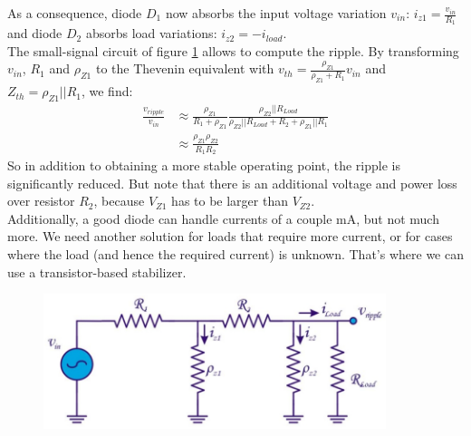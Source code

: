 As a consequence, diode $D_1$ now absorbs the input voltage variation $v_{in}$: $i_{z1} = \frac{v_{in}}{R_1}$ and diode $D_2$ absorbs load variations: $i_{z2} = -i_{load}$.\\
The small-signal circuit of figure \ref{fig:stabilizer5} allows to compute the ripple. 
By transforming $v_{in}$, $R_1$ and $\rho_{Z1}$ to the Thevenin equivalent with $v_{th} = \frac{\rho_{Z1}}{\rho_{Z1} + R_1} v_{in}$ and $Z_{th} = \rho_{Z1} || R_1$, we find:
\begin{align*}
	\frac{v_{ripple}}{v_{in}} &\approx \frac{\rho_{Z1}}{R_1 + \rho_{Z1}}  \frac{\rho_{Z2} || R_{Load}}{\rho_{Z2} || R_{Load} + R_2 + \rho_{Z1} || R_1} \\
							  &\approx \frac{\rho_{Z1} \rho_{Z2}}{R_1  R_2}
\end{align*}
So in addition to obtaining a more stable operating point, the ripple is significantly reduced. But note that there is an additional voltage and power loss over resistor $R_2$, because $V_{Z1}$ has to be larger than $V_{Z2}$.\\
Additionally, a good diode can handle currents of a couple mA, but not much more. We need another solution for loads that require more current, or for cases where the load (and hence the required current) is unknown. That's where we can use a transistor-based stabilizer.
\begin{figure}[h!]
	\centering
	\includegraphics[width=10cm]{figures/ch12/stabilizer5.jpg}
	\caption{}
	\label{fig:stabilizer5}
\end{figure}

